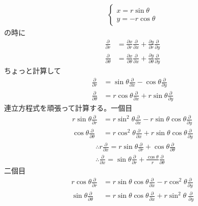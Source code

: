 \documentclass[a4paper,11pt]{jsarticle}
\begin{document}
\begin{align*}
  \begin{cases}
    x = r\sin\theta \\
    y = -r\cos\theta
  \end{cases}
\end{align*}
の時に
\begin{align*}
  \frac{\partial }{\partial r} &= 
  \frac{\partial x}{\partial r} \frac{\partial }{\partial x}
  + \frac{\partial y}{\partial r}\frac{\partial }{\partial y}
  \\ 
  \frac{\partial }{\partial \theta} &= 
  \frac{\partial x}{\partial \theta} \frac{\partial }{\partial x}
  + \frac{\partial y}{\partial \theta}\frac{\partial }{\partial y}
\end{align*}
ちょっと計算して
\begin{align*}
  \frac{\partial }{\partial r} &= 
  \sin\theta \frac{\partial }{\partial x}
  -\cos\theta\frac{\partial }{\partial y} \tag*{(1)}
  \\ 
  \frac{\partial }{\partial \theta} &= 
  r\cos\theta \frac{\partial }{\partial x}
  + r\sin\theta\frac{\partial }{\partial y} \tag*{(2)}
\end{align*}
連立方程式を頑張って計算する。一個目
\begin{align*}
  r\sin\theta \frac{\partial }{\partial r} &= r\sin^2\theta \frac{\partial }{\partial x} - r\sin\theta\cos\theta \frac{\partial }{\partial y} \tag*{(1)$\times r\sin\theta$}
  \\ \cos\theta \frac{\partial }{\partial \theta} &= r\cos^2\theta \frac{\partial }{\partial x} + r\sin\theta\cos\theta \frac{\partial }{\partial y} \tag*{(2)$\times \cos\theta$}
\end{align*}
\begin{align*}
  &\therefore r \frac{\partial }{\partial x} = r\sin\theta \frac{\partial }{\partial r} + \cos\theta \frac{\partial }{\partial \theta}
  \\& \therefore \frac{\partial }{\partial x} = \sin\theta \frac{\partial }{\partial r} + \frac{\cos\theta}{r} \frac{\partial }{\partial \theta}
\end{align*}
二個目
\begin{align*}
  r\cos\theta \frac{\partial }{\partial r} &= r\sin\theta\cos\theta \frac{\partial }{\partial x} - r\cos^2\theta \frac{\partial }{\partial y} \tag*{(1)$\times r\cos\theta$}
  \\ \sin\theta \frac{\partial }{\partial \theta} &= r\sin\theta\cos\theta \frac{\partial }{\partial x} + r\sin^2\theta\ \frac{\partial }{\partial y} \tag*{(2)$\times \sin\theta$}
\end{align*}
\end{document}
